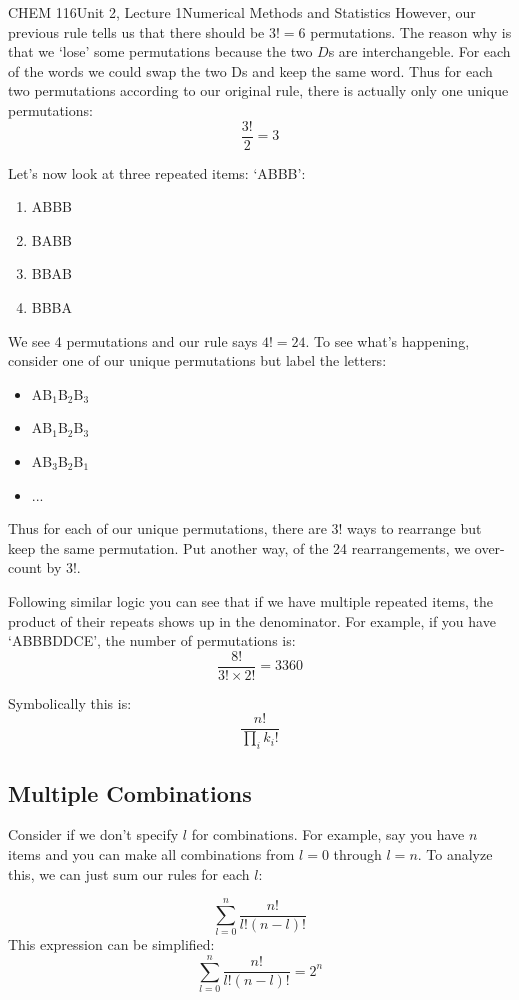 \documentclass{article}
\begin{document}
\begin{tdoc}{CHEM 116}{Unit 2, Lecture 1}{Numerical Methods and Statistics}
However, our previous rule tells us that there should be $3! = 6$ permutations. The reason why is that we `lose' some permutations because
the two $D$s are interchangeble. For each of the words we could swap the two Ds and keep the same word. Thus for each two permutations according
to our original rule, there is actually only one unique permutations:  $$ \frac{3!}{2} = 3$$

Let's now look at three repeated items: `ABBB':
\begin{enumerate}
\item ABBB
\item BABB
\item BBAB
\item BBBA
\end{enumerate}

We see 4 permutations and our rule says $4!=24$. To see what's happening, consider one of our unique permutations but label the letters:
\begin{itemize}
\item AB$_1$B$_2$B$_3$
\item AB$_1$B$_2$B$_3$
\item AB$_3$B$_2$B$_1$
\item ...
\end{itemize}
Thus for each of our unique permutations, there are $3!$ ways to rearrange but keep the same permutation. Put another way, of the 24 rearrangements,
we over-count by $3!$.

Following similar logic you can see that if we have multiple repeated items, the product of their repeats shows up in the denominator. For example, if you have `ABBBDDCE', the number of permutations is:
\[
\frac{8!}{3!\times2!} = 3360  
\]

Symbolically this is:
\begin{equation}
  \frac{n!}{\prod_i k_i!}
\end{equation}

\subsection{Multiple Combinations}
Consider if we don't specify $l$ for combinations. For example, say you have $n$ items and you can make all combinations from $l=0$ through $l=n$. To analyze this, we can just sum our rules for each $l$:

\[
  \sum_{l=0}^n \frac{n!}{l!(n - l)!}  
\]
This expression can be simplified:
\begin{equation}
  \sum_{l=0}^n \frac{n!}{l!(n - l)!} = 2^n
\end{equation}


\end{tdoc}
\end{document}
